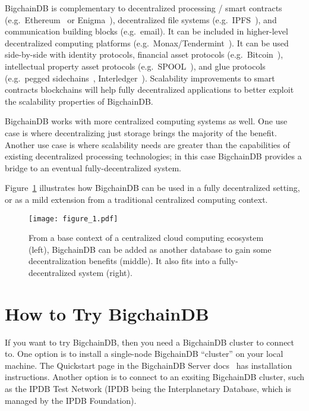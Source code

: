 \documentclass[a4paper]{article}
\begin{document}
BigchainDB is complementary to decentralized processing / smart contracts (e.g.~Ethereum~\cite{ethereum,buterin-ethereum} or Enigma~\cite{enigma,zyskind2015enigma}), decentralized file systems (e.g.~IPFS~\cite{ipfs}), and communication building blocks (e.g.~email).
It can be included in higher-level decentralized computing platforms (e.g.~Monax/Tendermint~\cite{monax,tendermint}).
It can be used side-by-side with identity protocols, financial asset protocols (e.g.~Bitcoin~\cite{nakamoto2009bitcoin}), intellectual property asset protocols (e.g.~SPOOL~\cite{dejonghe_spool}), and glue protocols (e.g.~pegged sidechains~\cite{back2010sidechains}, Interledger~\cite{thomas2015interledger}).
Scalability improvements to smart contracts blockchains will help fully decentralized applications to better exploit the scalability properties of BigchainDB.

BigchainDB works with more centralized computing systems as well.
One use case is where decentralizing just storage brings the majority of the benefit.
Another use case is where scalability needs are greater than the capabilities of existing decentralized processing technologies; in this case BigchainDB provides a bridge to an eventual fully-decentralized system.

Figure~\ref{fig:bigchain_ecosystem} illustrates how BigchainDB can be used in a fully decentralized setting, or as a mild extension from a traditional centralized computing context.


\begin{figure}[!ht]
  \centering
  \texttt{[image: figure\_1.pdf]}
  \caption{From a base context of a centralized cloud computing ecosystem (left), BigchainDB can be added as another database to gain some decentralization benefits (middle).
  It also fits into a fully-decentralized system (right).}
  \label{fig:bigchain_ecosystem}
\end{figure}


\section{How to Try BigchainDB}

If you want to try BigchainDB,
then you need a BigchainDB cluster to connect to.
One option is to install a single-node BigchainDB ``cluster''
on your local machine.
The Quickstart page
in the BigchainDB Server docs~\cite{bigchaindb_server_quickstart}
has installation instructions.
Another option is to connect to an exsiting
BigchainDB cluster, such as the IPDB Test Network
(IPDB being the Interplanetary Database,
which is managed by the IPDB Foundation\cite{ipdb_foundation_website}).
\end{document}
